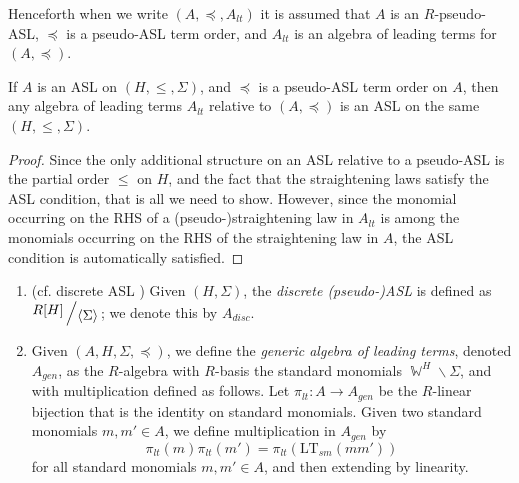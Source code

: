 \documentclass[11pt,reqno]{amsart}
\DeclareMathOperator{\W}{\mathbb{W}}
\newcommand{\bigslant}[2]{{\raisebox{.2em}{$#1$}\left/\raisebox{-.2em}{$#2$}\right.}}
\newcommand{\ltsm}{\text{LT}_{sm}}
\theoremstyle{definition}
\numberwithin{equation}{section}
\begin{document}
\begin{notation}
Henceforth when we write $(A, \preceq, A_{lt})$ it is assumed that $A$ is an $R$-pseudo-ASL, $\preceq$ is a pseudo-ASL term order, and $A_{lt}$ is an algebra of leading terms for $(A,\preceq)$.
\end{notation}

\begin{observation} \label{obs:ASLlt}
If $A$ is an ASL on $(H, \leq, \Sigma)$, and $\preceq$ is a pseudo-ASL term order on $A$, then any algebra of leading terms $A_{lt}$ relative to $(A,\preceq)$ is an ASL on the same $(H, \leq, \Sigma)$.
\end{observation}

\begin{proof}
Since the only additional structure on an ASL relative to a pseudo-ASL is the partial order $\leq$ on $H$, and the fact that the straightening laws satisfy the ASL condition, that is all we need to show. However, since the monomial occurring on the RHS of a (pseudo-)straightening law in $A_{lt}$ is among the monomials occurring on the RHS of the straightening law in $A$, the ASL condition is automatically satisfied.
\end{proof}

\newcommand{\Adisc}{A_{disc}}

\begin{definition}
\label{defn:agen-adisc}
\begin{enumerate}
\item (cf. discrete ASL \cite{deconcini1987hodge}) Given $(H, \Sigma)$, the \emph{discrete (pseudo-)ASL} is defined as $\bigslant{R[H]}{\langle \Sigma \rangle}$; we denote this by  $\Adisc$. 
\item Given $(A,H,\Sigma,\preceq)$, we define the \emph{generic algebra of leading terms}, denoted $A_{gen}$, as the $R$-algebra with $R$-basis the standard monomials $\W^H \backslash \Sigma$, and with multiplication defined as follows. Let $\pi_{lt} \colon A \to A_{gen}$ be the $R$-linear bijection that is the identity on standard monomials. Given two standard monomials $m,m' \in A$, we define multiplication in $A_{gen}$ by
\begin{equation} \label{eq:agen}
\pi_{lt}(m) \pi_{lt}(m') = \pi_{lt}(\ltsm(mm'))
\end{equation}
for all standard monomials $m,m' \in A$, and then extending by linearity.
\end{enumerate}
\end{definition}
\end{document}
